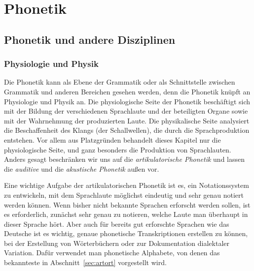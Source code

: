 \chapter{Phonetik}

\label{sec:phonetik}

\section{Phonetik und andere Disziplinen}

\subsection{Physiologie und Physik}

Die Phonetik kann als Ebene der Grammatik oder als Schnittstelle zwischen Grammatik und anderen Bereichen gesehen werden, denn die Phonetik knüpft an  Physiologie und Physik an.
Die physiologische Seite der Phonetik beschäftigt sich mit der Bildung der verschiedenen Sprachlaute und der beteiligten Organe sowie mit der Wahrnehmung der produzierten Laute.
Die physikalische Seite analysiert die Beschaffenheit des Klangs (der Schallwellen), die durch die Sprachproduktion entstehen.
Vor allem aus Platzgründen behandelt dieses Kapitel nur die physiologische Seite, und ganz besonders die Produktion von Sprachlauten.
Anders gesagt beschränken wir uns auf die \textit{artikulatorische Phonetik} und lassen die \textit{auditive} und die \textit{akustische Phonetik} außen vor.


Eine wichtige Aufgabe der artikulatorischen Phonetik ist es, ein Notationssystem zu entwickeln, mit dem Sprachlaute möglichst eindeutig und sehr genau notiert werden können.
Wenn bisher nicht bekannte Sprachen erforscht werden sollen, ist es \zB erforderlich, zunächst sehr genau zu notieren, welche Laute man überhaupt in dieser Sprache hört.
Aber auch für bereits gut erforschte Sprachen wie das Deutsche ist es wichtig, genaue phonetische Transkriptionen erstellen zu können, \zB bei der Erstellung von Wörterbüchern oder zur Dokumentation dialektaler Variation.
Dafür verwendet man phonetische Alphabete, von denen das bekannteste in Abschnitt~\ref{sec:artort} vorgestellt wird.

